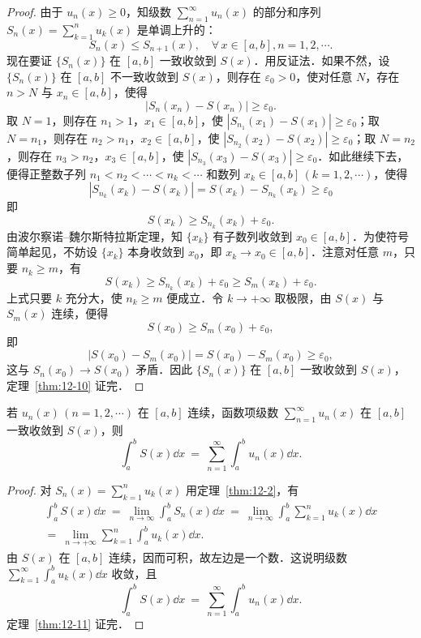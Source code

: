 \begin{proof}
由于 $u_{n}(x)\geqslant 0$，知级数 $\displaystyle\sum_{n=1}^{\infty}u_{n}(x)$ 的部分和序列 $S_{n}(x)=\displaystyle\sum_{k=1}^{n}u_{k}(x)$ 是单调上升的：
\[
S_{n}(x)\leqslant S_{n+1}(x),\quad\forall\,x\in[a,b],n=1,2,\cdots.
\]
现在要证 $\{S_{n}(x)\}$ 在 $[a,b]$ 一致收敛到 $S(x)$．用反证法．如果不然，设 $\{S_{n}(x)\}$ 在 $[a,b]$ 不一致收敛到 $S(x)$，则存在 $\varepsilon_{0}>0$，使对任意 $N$，存在 $n>N$ 与 $x_{n}\in[a,b]$，使得
\[
\left|S_{n}(x_{n})-S(x_{n})\right|\geqslant\varepsilon_{0}.
\]
取 $N=1$，则存在 $n_{1}>1$，$x_{1}\in[a,b]$，使 $\left|S_{n_{1}}(x_{1})-S(x_{1})\right|\geqslant\varepsilon_{0}$；取 $N=n_{1}$，则存在 $n_{2}>n_{1}$，$x_{2}\in[a,b]$，使 $\left|S_{n_{2}}(x_{2})-S(x_{2})\right|\geqslant\varepsilon_{0}$；取 $N=n_{2}$，则存在 $n_{3}>n_{2}$，$x_{3}\in[a,b]$，使 $\left|S_{n_{3}}(x_{3})-S(x_{3})\right|\geqslant\varepsilon_{0}$．如此继续下去，便得正整数子列 $n_{1}<n_{2}<\cdots<n_{k}<\cdots$ 和数列 $x_{k}\in[a,b]\,(k=1,2,\cdots)$，使得
\[
\left|S_{n_{k}}(x_{k})-S(x_{k})\right|=S(x_{k})-S_{n_{k}}(x_{k})\geqslant\varepsilon_{0}
\]
即
\[
S(x_{k})\geqslant S_{n_{k}}(x_{k})+\varepsilon_{0}.
\]
由波尔察诺--魏尔斯特拉斯定理，知 $\{x_{k}\}$ 有子数列收敛到 $x_{0}\in[a,b]$．为使符号简单起见，不妨设 $\{x_{k}\}$ 本身收敛到 $x_{0}$，即 $x_{k}\to x_{0}\in[a,b]$．注意对任意 $m$，只要 $n_{k}\geqslant m$，有
\[
S(x_{k})\geqslant S_{n_{k}}(x_{k})+\varepsilon_{0}\geqslant S_{m}(x_{k})+\varepsilon_{0}.
\]
上式只要 $k$ 充分大，使 $n_{k}\geqslant m$ 便成立．令 $k\to+\infty$ 取极限，由 $S(x)$ 与 $S_{m}(x)$ 连续，便得
\[
S(x_{0})\geqslant S_{m}(x_{0})+\varepsilon_{0},
\]
即
\[
\left|S(x_{0})-S_{m}(x_{0})\right|=S(x_{0})-S_{m}(x_{0})\geqslant\varepsilon_{0},
\]
这与 $S_{n}(x_{0})\to S(x_{0})$ 矛盾．因此 $\{S_{n}(x)\}$ 在 $[a,b]$ 一致收敛到 $S(x)$，定理~\ref{thm:12-10} 证完．
\end{proof}

\begin{theorem}[逐项积分]\label{thm:12-11}
若 $u_{n}(x)\,(n=1,2,\cdots)$ 在 $[a,b]$ 连续，函数项级数 $\displaystyle\sum_{n=1}^{\infty}u_{n}(x)$ 在 $[a,b]$ 一致收敛到 $S(x)$，则
\[
\int_{a}^{b}S(x)\dd x\ =\ \sum_{n=1}^{\infty}\int_{a}^{b}u_{n}(x)\dd x.
\]
\end{theorem}

\begin{proof}
对 $S_{n}(x)=\displaystyle\sum_{k=1}^{n}u_{k}(x)$ 用定理~\ref{thm:12-2}，有
\[
\begin{aligned}
\int_{a}^{b}S(x)\dd x\ =\ \lim_{n\to\infty}\int_{a}^{b}S_{n}(x)\dd x\ =\ \lim_{n\to\infty}\int_{a}^{b}\sum_{k=1}^{n}u_{k}(x)\dd x\\
=\ \lim_{n\to+\infty}\sum_{k=1}^{n}\int_{a}^{b}u_{k}(x)\dd x.
\end{aligned}
\]
由 $S(x)$ 在 $[a,b]$ 连续，因而可积，故左边是一个数．这说明级数 $\displaystyle\sum_{k=1}^{\infty}\int_{a}^{b}u_{k}(x)\dd x$ 收敛，且
\[
\int_{a}^{b}S(x)\dd x\ =\ \sum_{n=1}^{\infty}\int_{a}^{b}u_{n}(x)\dd x.
\]
定理~\ref{thm:12-11} 证完．
\end{proof}

